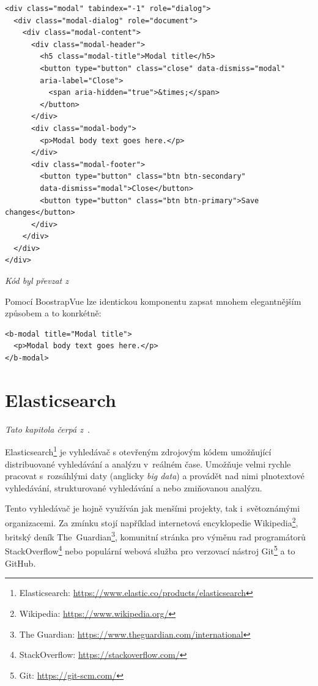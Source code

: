 \begin{verbatim}
<div class="modal" tabindex="-1" role="dialog">
  <div class="modal-dialog" role="document">
    <div class="modal-content">
      <div class="modal-header">
        <h5 class="modal-title">Modal title</h5>
        <button type="button" class="close" data-dismiss="modal"
        aria-label="Close">
          <span aria-hidden="true">&times;</span>
        </button>
      </div>
      <div class="modal-body">
        <p>Modal body text goes here.</p>
      </div>
      <div class="modal-footer">
        <button type="button" class="btn btn-secondary"
        data-dismiss="modal">Close</button>
        <button type="button" class="btn btn-primary">Save changes</button>
      </div>
    </div>
  </div>
</div>
\end{verbatim}
\emph{Kód byl převzat z~\cite{bib:bootstrap-modal}}

Pomocí BoostrapVue lze identickou komponentu zapsat mnohem elegantnějším způsobem a to konrkétně:

\begin{verbatim}
<b-modal title="Modal title">
  <p>Modal body text goes here.</p>
</b-modal>
\end{verbatim}




\section{Elasticsearch}
\emph{Tato kapitola čerpá z~\cite{bib:elastic-defnitive}}.

Elasticsearch\footnote{Elasticsearch: \url{https://www.elastic.co/products/elasticsearch}} je vyhledávač s otevřeným zdrojovým kódem umožňující distribuované vyhledávání a analýzu v~reálném čase. Umožňuje velmi rychle pracovat s~rozsáhlými daty (anglicky \emph{big data}) a provádět nad nimi plnotextové vyhledávání, strukturované vyhledávání a nebo zmiňovanou analýzu.

Tento vyhledávač je hojně využíván jak menšími projekty, tak i~světoznámými organizacemi. Za zmínku stojí například internetová encyklopedie Wikipedia\footnote{Wikipedia: \url{https://www.wikipedia.org/}}, britský deník The~Guardian\footnote{The Guardian: \url{https://www.theguardian.com/international}}, komunitní stránka pro výměnu rad programátorů StackOverflow\footnote{StackOverflow: \url{https://stackoverflow.com/}} nebo populární webová služba pro verzovací nástroj Git\footnote{Git: \url{https://git-scm.com/}} a to GitHub.

